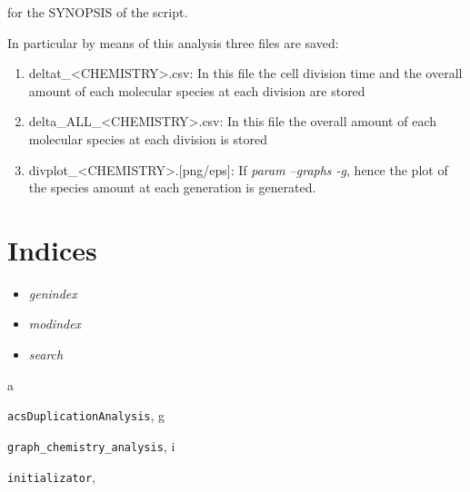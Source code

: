 \documentclass[letterpaper,10pt,english]{sphinxmanual}
\begin{document}
for the SYNOPSIS of the script.

In particular by means of this analysis three files are saved:
\begin{enumerate}
\item {} 
deltat\_\textless{}CHEMISTRY\textgreater{}.csv: In this file the cell division time and the overall amount of each molecular species at each division are stored

\item {} 
delta\_ALL\_\textless{}CHEMISTRY\textgreater{}.csv: In this file the overall amount of each molecular species at each division is stored

\item {} 
divplot\_\textless{}CHEMISTRY\textgreater{}.{[}png/eps{]}: If \emph{param --graphs -g}, hence the plot of the species amount at each generation is generated.

\end{enumerate}


\chapter{Indices}
\label{index:indices}\begin{itemize}
\item {} 
\emph{genindex}

\item {} 
\emph{modindex}

\item {} 
\emph{search}

\end{itemize}


\renewcommand{\indexname}{Python Module Index}
\begin{theindex}
\def\bigletter#1{{\Large\sffamily#1}\nopagebreak\vspace{1mm}}
\bigletter{a}
\item {\texttt{acsDuplicationAnalysis}}, \pageref{acsDuplicationAnalysis:module-acsDuplicationAnalysis}
\indexspace
\bigletter{g}
\item {\texttt{graph\_chemistry\_analysis}}, \pageref{graph_chemistry_analysis:module-graph_chemistry_analysis}
\indexspace
\bigletter{i}
\item {\texttt{initializator}}, \pageref{initializator:module-initializator}
\end{theindex}

\renewcommand{\indexname}{Index}
\printindex
\end{document}
